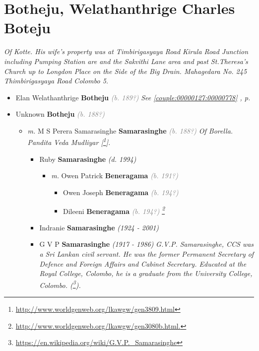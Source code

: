 \documentclass[10pt, openany]{book}
\begin{document}
\chapter{Botheju, Welathanthrige Charles Boteju}
\label{00000128}
\textcolor{slmaroon}{\textit{Of Kotte. His wife's property was at Timbirigasyaya Road Kirula Road Junction including Pumping Station are and the Sakvithi Lane area and past St.Theresa's Church up to Longdon Place on the Side of the Big Drain. Mahagedara No. 245 Thimbirigasyaya Road Colombo 5.}}
\begin{itemize}
\item{Elan Welathanthrige \textbf{Botheju} \textcolor{gray}{\textit{(b. 189?)}} \textcolor{slteal}{\textit{See  \autoref{couple:00000127:00000778} \textit{, p. \pageref{couple:00000127:00000778} }}}}
\item{Unknown \textbf{Botheju} \textcolor{gray}{\textit{(b. 188?)}}
\begin{itemize}
\item{\textit{m.} M S Perera Samarasinghe \textbf{Samarasinghe} \textcolor{gray}{\textit{(b. 188?)}} \textcolor{slmaroon}{\textit{Of Borella. Pandita Veda Mudliyar [\footnote{\url{http://www.worldgenweb.org/lkawgw/gen3809.html}}].}}   \label{couple:00003706:00003707} \begin{itemize}
\item{Ruby \textbf{Samarasinghe} \textcolor{slorange}{\textit{(d. 1994)}}
\begin{itemize}
\item{\textit{m.} Owen Patrick \textbf{Beneragama} \textcolor{gray}{\textit{(b. 191?)}}   \label{couple:00003734:00003736} \begin{itemize}
\item{Owen Joseph \textbf{Beneragama} \textcolor{gray}{\textit{(b. 194?)}}
  }
\item{Dileeni \textbf{Beneragama} \textcolor{gray}{\textit{(b. 194?)}} \textcolor{slmaroon}{\textit{\footnote{\url{http://www.worldgenweb.org/lkawgw/gen3080b.html.}}}}
 }
\end{itemize}}
\end{itemize}
 }
\item{Indranie \textbf{Samarasinghe} \textcolor{slorange}{\textit{(1924 - 2001)}}
 }
\item{G V P \textbf{Samarasinghe} \textcolor{slorange}{\textit{(1917 - 1986)}} \textcolor{slmaroon}{\textit{G.V.P. Samarasinghe, CCS was a Sri Lankan civil servant. He was the former Permanent Secretary of Defence and Foreign Affairs and Cabinet Secretary. Educated at the Royal College, Colombo, he is a graduate from the University College, Colombo. (\footnote{\url{https://en.wikipedia.org/wiki/G.V.P._Samarasinghe}}).
}}}
\end{itemize}}
\end{itemize}}
\end{itemize}
\end{document}
